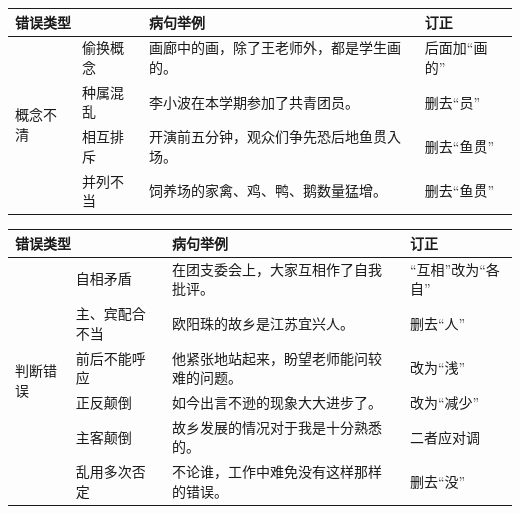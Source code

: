 \noindent
\begin{tabular}{|ll|p{10em}|p{6em}|}
	\hline
	\multicolumn{2}{|l|}{错误类型}                         & 病句举例                 & 订正      \\ \hline
	\multicolumn{1}{|l|}{\multirow{4}{*}{概念不清}} & 偷换概念 & 画廊中的画，除了王老师外，都是学生画的。 & 后面加“画的” \\ \cline{2-4} 
	\multicolumn{1}{|l|}{}                      & 种属混乱 & 李小波在本学期参加了共青团员。      & 删去“员”   \\ \cline{2-4} 
	\multicolumn{1}{|l|}{}                      & 相互排斥 & 开演前五分钟，观众们争先恐后地鱼贯入场。 & 删去“鱼贯”  \\ \cline{2-4} 
	\multicolumn{1}{|l|}{}                      & 并列不当 & 饲养场的家禽、鸡、鸭、鹅数量猛增。    & 删去“鱼贯”  \\ \hline
\end{tabular}

\noindent
\begin{tabular}{|lp{5em}|p{10em}|p{5em}|}
	\hline
	\multicolumn{2}{|l|}{错误类型}                            & 病句举例                 & 订正         \\ \hline
	\multicolumn{1}{|l|}{\multirow{6}{*}{判断错误}} & 自相矛盾    & 在团支委会上，大家互相作了自我批评。   & “互相”改为“各自” \\ \cline{2-4} 
	\multicolumn{1}{|l|}{}                      & 主、宾配合不当 & 欧阳珠的故乡是江苏宜兴人。        & 删去“人”      \\ \cline{2-4} 
	\multicolumn{1}{|l|}{}                      & 前后不能呼应  & 他紧张地站起来，盼望老师能问较难的问题。 & 改为“浅”      \\ \cline{2-4} 
	\multicolumn{1}{|l|}{}                      & 正反颠倒    & 如今出言不逊的现象大大进步了。      & 改为“减少”     \\ \cline{2-4} 
	\multicolumn{1}{|l|}{}                      & 主客颠倒    & 故乡发展的情况对于我是十分熟悉的。    & 二者应对调      \\ \cline{2-4} 
	\multicolumn{1}{|l|}{}                      & 乱用多次否定  & 不论谁，工作中难免没有这样那样的错误。  & 删去“没”      \\ \hline
\end{tabular}

